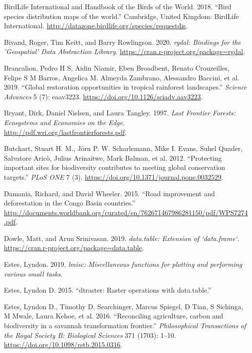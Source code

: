 \documentclass[
]{article}
\begin{document}
\leavevmode\hypertarget{ref-BirdLife2018}{}%
BirdLife International and Handbook of the Birds of the World. 2018. ``Bird species distribution maps of the world.'' Cambridge, United Kingdom: BirdLife International. \url{http://datazone.birdlife.org/species/requestdis}.

\leavevmode\hypertarget{ref-R-rgdal}{}%
Bivand, Roger, Tim Keitt, and Barry Rowlingson. 2020. \emph{rgdal: Bindings for the 'Geospatial' Data Abstraction Library}. \url{https://cran.r-project.org/package=rgdal}.

\leavevmode\hypertarget{ref-Brancalion2019}{}%
Brancalion, Pedro H S, Aidin Niamir, Eben Broadbent, Renato Crouzeilles, Felipe S M Barros, Angelica M. Almeyda Zambrano, Alessandro Baccini, et al. 2019. ``Global restoration opportunities in tropical rainforest landscapes.'' \emph{Science Advances} 5 (7): eaav3223. \url{https://doi.org/10.1126/sciadv.aav3223}.

\leavevmode\hypertarget{ref-Bryant1997}{}%
Bryant, Dirk, Daniel Nielsen, and Laura Tangley. 1997. \emph{Last Frontier Forests: Ecosystems and Economies on the Edge}. \url{http://pdf.wri.org/lastfrontierforests.pdf}.

\leavevmode\hypertarget{ref-Butchart2012}{}%
Butchart, Stuart H. M., Jörn P. W. Scharlemann, Mike I. Evans, Suhel Quader, Salvatore Aricò, Julius Arinaitwe, Mark Balman, et al. 2012. ``Protecting important sites for biodiversity contributes to meeting global conservation targets.'' \emph{PLoS ONE} 7 (3). \url{https://doi.org/10.1371/journal.pone.0032529}.

\leavevmode\hypertarget{ref-Damania2015}{}%
Damania, Richard, and David Wheeler. 2015. ``Road improvement and deforestation in the Congo Basin countries.'' \url{http://documents.worldbank.org/curated/en/762671467986281150/pdf/WPS7274.pdf}.

\leavevmode\hypertarget{ref-R-data.table}{}%
Dowle, Matt, and Arun Srinivasan. 2019. \emph{data.table: Extension of `data.frame`}. \url{https://cran.r-project.org/package=data.table}.

\leavevmode\hypertarget{ref-R-lmisc}{}%
Estes, Lyndon. 2019. \emph{lmisc: Miscellaneous functions for plotting and performing various small tasks}.

\leavevmode\hypertarget{ref-Estes2015}{}%
Estes, Lyndon D. 2015. ``dtraster: Raster operations with data.table.''

\leavevmode\hypertarget{ref-Estes2016a}{}%
Estes, Lyndon D., Timothy D. Searchinger, Marcus Spiegel, D Tian, S Sichinga, M Mwale, Laura Kehoe, et al. 2016. ``Reconciling agriculture, carbon and biodiversity in a savannah transformation frontier.'' \emph{Philosophical Transactions of the Royal Society B: Biological Sciences} 371 (1703): 1--10. \url{https://doi.org/10.1098/rstb.2015.0316}.
\end{document}
